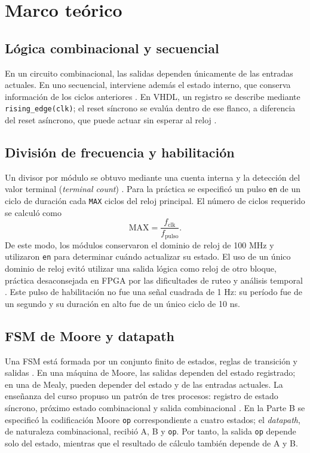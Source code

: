 \documentclass[conference]{IEEEtran}
\begin{document}
\section{Marco teórico}
\subsection{Lógica combinacional y secuencial}
En un circuito combinacional, las salidas dependen únicamente de las entradas actuales. En uno secuencial, interviene además el estado interno, que conserva información de los ciclos anteriores \cite{cursofsm}. En VHDL, un registro se describe mediante \texttt{rising\_edge(clk)}; el reset síncrono se evalúa dentro de ese flanco, a diferencia del reset asíncrono, que puede actuar sin esperar al reloj \cite{ug901}. 

\subsection{División de frecuencia y habilitación}
Un divisor por módulo se obtuvo mediante una cuenta interna y la detección del valor terminal (\emph{terminal count}) \cite{cursodiv}. Para la práctica se especificó un pulso \texttt{en} de un ciclo de duración cada \texttt{MAX} ciclos del reloj principal. El número de ciclos requerido se calculó como
\begin{equation}
\mathrm{MAX}=\frac{f_{\mathrm{clk}}}{f_{\mathrm{pulso}}}.
\label{eq:max}
\end{equation}
De este modo, los módulos conservaron el dominio de reloj de 100 MHz y utilizaron \texttt{en} para determinar cuándo actualizar su estado. El uso de un único dominio de reloj evitó utilizar una salida lógica como reloj de otro bloque, práctica desaconsejada en FPGA por las dificultades de ruteo y análisis temporal \cite{cursodiv}. Este pulso de habilitación no fue una señal cuadrada de 1 Hz: su período fue de un segundo y su duración en alto fue de un único ciclo de 10 ns.

\subsection{FSM de Moore y datapath}
Una FSM está formada por un conjunto finito de estados, reglas de transición y salidas \cite{cursofsm}. En una máquina de Moore, las salidas dependen del estado registrado; en una de Mealy, pueden depender del estado y de las entradas actuales. La enseñanza del curso propuso un patrón de tres procesos: registro de estado síncrono, próximo estado combinacional y salida combinacional \cite{cursofsm}. En la Parte B se especificó la codificación Moore \texttt{op} correspondiente a cuatro estados; el \emph{datapath}, de naturaleza combinacional, recibió A, B y \texttt{op}. Por tanto, la salida \texttt{op} depende solo del estado, mientras que el resultado de cálculo también depende de A y B.
\end{document}
